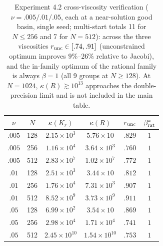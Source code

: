 \documentclass[11pt]{article}
\numberwithin{equation}{section}
\begin{document}
\begin{table}[ht]\centering\small\renewcommand{\arraystretch}{1.2}
\begin{tabular}{cccccc}
\toprule
$\nu$ & $N$ & $\kappa(K_r)$ & $\kappa(R)$ & $r_{\rm unc}$ & $\beta^*_{\rm rat}$\\
\midrule
$.005$ & 128 & $2.15\times10^3$ & $5.76\times10$ & $.829$ & $1$\\
$.005$ & 256 & $1.16\times10^4$ & $3.64\times10^3$ & $.760$ & $1$\\
$.005$ & 512 & $2.83\times10^7$ & $1.02\times10^7$ & $.772$ & $1$\\
\midrule
$.01$  & 128 & $2.51\times10^3$ & $3.44\times10$ & $.812$ & $1$\\
$.01$  & 256 & $1.76\times10^4$ & $7.31\times10^3$ & $.907$ & $1$\\
$.01$  & 512 & $8.52\times10^9$ & $3.73\times10^9$ & $.911$ & $1$\\
\midrule
$.05$  & 128 & $6.99\times10^2$ & $3.54\times10$ & $.869$ & $1$\\
$.05$  & 256 & $2.98\times10^4$ & $1.71\times10^4$ & $.741$ & $1$\\
$.05$ & 512 & $2.45\times10^{10}$ & $1.54\times10^{10}$ & $.753$ & $1$\\
\bottomrule
\end{tabular}
\caption{Experiment 4.2 cross-viscosity verification ($\nu=.005/.01/.05$, each at a near-solution good basin, single seed; multi-start totals 11 for $N\le256$ and 7 for $N=512$): across the three viscosities $r_{\rm unc}\in[.74,.91]$ (unconstrained optimum improves $9\%$--$26\%$ relative to Jacobi), and the in-family optimum of the rational family is always $\beta=1$ (all 9 groups at $N\ge128$). At $N=1024$, $\kappa(R)\gtrsim10^{13}$ approaches the double-precision limit and is not included in the main table.}\label{tab:f1d-crossnu}
\end{table}
\end{document}
